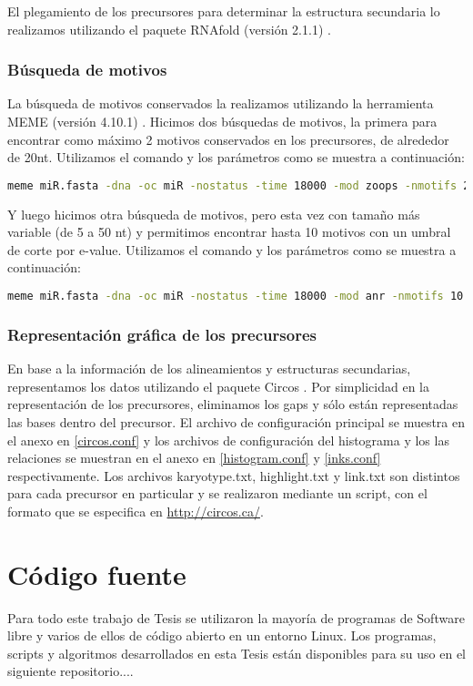 El plegamiento de los precursores para determinar la estructura secundaria lo realizamos utilizando el paquete RNAfold (versión 2.1.1) \citep{pmid22115189}.

\subsubsection{Búsqueda de motivos}
La búsqueda de motivos conservados la realizamos utilizando la herramienta MEME (versión 4.10.1) \citep{pmid7584402}.
Hicimos dos búsquedas de motivos, la primera para encontrar como máximo 2 motivos conservados en los precursores, de alrededor de 20nt.
Utilizamos el comando y los parámetros como se muestra a continuación:

\begin{lstlisting}[language=bash]
meme miR.fasta -dna -oc miR -nostatus -time 18000 -mod zoops -nmotifs 2 -minw 19 -maxw 23 -revcomp
\end{lstlisting}

Y luego hicimos otra búsqueda de motivos, pero esta vez con tamaño más variable (de 5 a 50 nt) y permitimos encontrar hasta 10 motivos con un umbral de corte por e-value.
Utilizamos el comando y los parámetros como se muestra a continuación:

\begin{lstlisting}[language=bash]
meme miR.fasta -dna -oc miR -nostatus -time 18000 -mod anr -nmotifs 10 -minw 5 -maxw 50 -revcomp -evt 1e-3
\end{lstlisting}

\subsubsection{Representación gráfica de los precursores}
En base a la información de los alineamientos y estructuras secundarias, representamos los datos utilizando el paquete Circos \citep{pmid19541911}.
Por simplicidad en la representación de los precursores, eliminamos los gaps y sólo están representadas las bases dentro del precursor. 
El archivo de configuración principal se muestra en el anexo en \ref{circos.conf} y los archivos de configuración del histograma y los las relaciones se muestran en el anexo en \ref{histogram.conf} y \ref{inks.conf} respectivamente. 
Los archivos karyotype.txt, highlight.txt y link.txt son distintos para cada precursor en particular y se realizaron mediante un script, con el formato que se especifica en \url{http://circos.ca/}.

\section{Código fuente}
Para todo este trabajo de Tesis se utilizaron la mayoría de programas de Software libre y varios de ellos de código abierto en un entorno Linux.
Los programas, scripts y algoritmos desarrollados en esta Tesis están disponibles para su uso en el siguiente repositorio....
